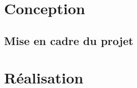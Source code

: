 \documentclass{book}
\begin{document}
  
  \frontmatter
  \tableofcontents
  
  \mainmatter
  \chapter{Conception}
  \section{Mise en cadre du projet}

  \chapter{Réalisation}
  
\end{document}
